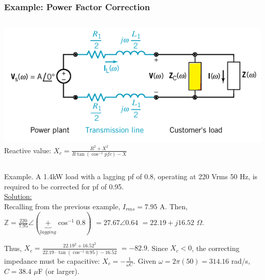 \documentclass{beamer}
\begin{document}


\begin{frame}[fragile]
\frametitle{Example: Power Factor Correction}

\vspace{-0.5cm}

\begin{columns}[c]
\includegraphics[width=\textwidth]{src/pfc0.png}
%
Reactive value:
$X_c = \frac{R^2 + X^2}{R \tan(\cos^{-1} pfc) - X}$
\end{columns}

Example. 
A 1.4kW load with a lagging pf of 0.8, operating at 220 Vrms 50 Hz,
is required to be corrected for pf of 0.95.
\\
\underline{Solution:} \\
Recalling from the previous example,
$I_{rms} = 7.95$ A.
Then, $\mathbb{Z} = \frac{220}{7.95} \angle (\underbrace{+}_{lagging}\cos^{-1} 0.8)$
$= 27.67 \angle 0.64$
$= 22.19 + j16.52$ $\Omega$.

Thus, $X_c = \frac{22.19^2 + 16.52^2}{22.19 \cdot \tan(\cos^{-1} 0.95) - 16.52}$ 
$= -82.9$.
Since $X_c < 0$, the correcting impedance must be capacitive:
$X_c = -\frac{1}{\omega C}$. Given $\omega = 2\pi(50) = 314.16$ rad/s, $C = 38.4$ $\mu$F (or larger).

\end{frame}

\end{document}
